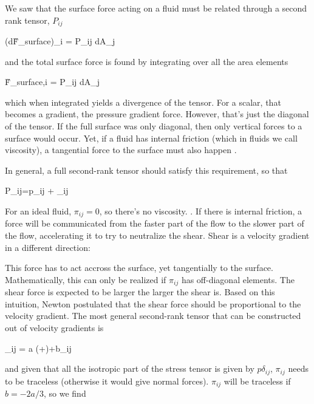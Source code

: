 We saw that the surface force acting on a fluid must be related
through a second rank tensor, $P_{ij}$

\beq
\left(d\v{F}_{\rm surface}\right)_i = P_{ij} dA_j
\eeq

\noindent and the total surface force is found by integrating over all the area
elements

\beq
\v{F}_{{\rm surface},i} = \oint P_{ij} dA_j
\eeq

\noindent which when integrated yields a divergence of the tensor. For a scalar,
that becomes a gradient, the pressure gradient force. However, that's
just the diagonal of the tensor. If the full surface was only
diagonal, then only vertical forces to a surface would occur. Yet, if
a fluid has internal friction (which in fluids we call viscosity), a
tangential force to the surface must also happen . 

In general, a full second-rank
tensor should satisfy this requirement, so that

\beq
P_{ij}=p\delta_{ij} + \pi_{ij}
\eeq

For an ideal fluid, $\pi_{ij}=0$, so there's no
viscosity. . If there is
internal friction, a force will be communicated from the faster part
of the flow to the slower part of the flow, accelerating it to try to
neutralize the shear.  Shear is a velocity gradient in a different
direction:

\beq
{}
\eeq

This force has to act accross the surface, yet tangentially to the surface. Mathematically,
this can only be realized if $\pi_{ij}$ has off-diagonal elements. The
shear force is expected to be larger the larger the shear is. Based on
this intuition, Newton
postulated that the shear force should be proportional to the
velocity gradient. The most general second-rank tensor that can be
constructed out of velocity gradients is 


\beq
\pi_{ij} = a \left(+\right)+b\delta_{ij}
\eeq

\noindent and given that all the isotropic part of the stress tensor is given by
$p\delta_{ij}$, $\pi_{ij}$ needs to be traceless (otherwise it would give
normal forces). $\pi_{ij}$ will be traceless if $b=-2a/3$, so we find 

